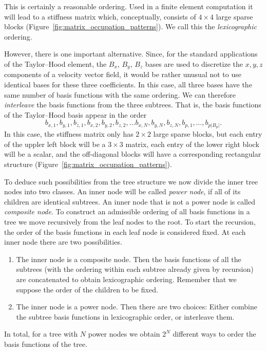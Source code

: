\documentclass[a4paper,10pt,headings=normal,bibliography=totoc]{scrartcl}
\newcommand{\abs}[1]{{\lvert#1\rvert}}
\begin{document}
This is certainly a reasonable ordering.  Used in a finite element computation it will lead to a stiffness
matrix which, conceptually, consists of $4 \times 4$ large sparse blocks (Figure~\ref{fig:matrix_occupation_patterns}).
We call this the {\em lexicographic} ordering.

However, there is one important alternative.  Since, for the standard applications of the Taylor--Hood element,
the $B_x$, $B_y$, $B_z$ bases are used to discretize the $x, y, z$ components of a velocity vector field,
it would be rather unusual not to use identical bases for these three coefficients.
In this case, all three bases have the same number of basis functions with the same ordering.  We can therefore
{\em interleave} the basis functions from the three subtrees.  That is,
the basis functions of the Taylor--Hood basis appear in the order
\begin{equation*}
 b_{x,1}, b_{y,1}, b_{z,1},
 b_{x,2}, b_{y,2}, b_{z,2},
 \dots
 b_{x,N}, b_{y,N}, b_{z,N},
 b_{p,1}, \dots, b_{p\abs{B_p}}.
\end{equation*}
In this case, the stiffness matrix only has $2 \times 2$ large sparse blocks, but each entry of the uppler left
block will be a $3 \times 3$ matrix, each entry of the lower right block will be a scalar, and the off-diagonal
blocks will have a corresponding rectangular structure (Figure~\ref{fig:matrix_occupation_patterns}).

To deduce such possibilities from the tree structure we now divide the inner tree nodes into two classes.
An inner node will be called {\em power node}, if all of its children are identical subtrees.
An inner node that is not a power node is called {\em composite node}.  To construct an admissible ordering
of all basis functions in a tree we move recursively from the leaf nodes to the root.  To start the recursion,
the order of the basis functions in each leaf node is considered fixed.  At each inner node there are two
possibilities.
\begin{enumerate}
 \item The inner node is a composite node.  Then the basis functions of all the subtrees (with the ordering
   within each subtree already given by recursion) are concatenated to obtain lexicographic ordering.
   Remember that we suppose the order of the children to be fixed.
 \item The inner node is a power node.  Then there are two choices: Either combine the subtree basis functions
   in lexicographic order, or interleave them.
\end{enumerate}
In total, for a tree with $N$ power nodes we obtain $2^N$ different ways to order the basis functions of the tree.
\end{document}
